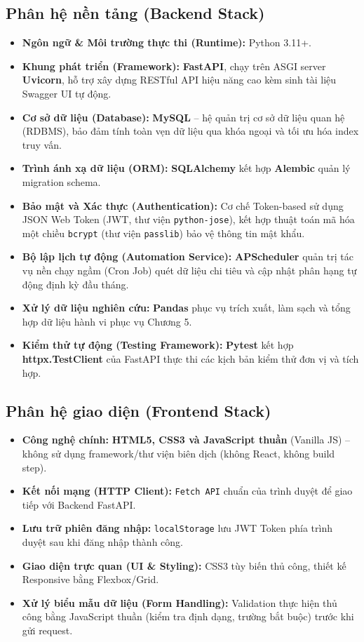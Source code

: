 \subsection{Phân hệ nền tảng (Backend Stack)}
\begin{itemize}
    \item \textbf{Ngôn ngữ \& Môi trường thực thi (Runtime):} Python 3.11+.
    \item \textbf{Khung phát triển (Framework):} \textbf{FastAPI}, chạy trên ASGI server \textbf{Uvicorn}, hỗ trợ xây dựng RESTful API hiệu năng cao kèm sinh tài liệu Swagger UI tự động.
    \item \textbf{Cơ sở dữ liệu (Database):} \textbf{MySQL} -- hệ quản trị cơ sở dữ liệu quan hệ (RDBMS), bảo đảm tính toàn vẹn dữ liệu qua khóa ngoại và tối ưu hóa index truy vấn.
    \item \textbf{Trình ánh xạ dữ liệu (ORM):} \textbf{SQLAlchemy} kết hợp \textbf{Alembic} quản lý migration schema.
    \item \textbf{Bảo mật và Xác thực (Authentication):} Cơ chế Token-based sử dụng JSON Web Token (JWT, thư viện \texttt{python-jose}), kết hợp thuật toán mã hóa một chiều \texttt{bcrypt} (thư viện \texttt{passlib}) bảo vệ thông tin mật khẩu.
    \item \textbf{Bộ lập lịch tự động (Automation Service):} \textbf{APScheduler} quản trị tác vụ nền chạy ngầm (Cron Job) quét dữ liệu chi tiêu và cập nhật phân hạng tự động định kỳ đầu tháng.
    \item \textbf{Xử lý dữ liệu nghiên cứu:} \textbf{Pandas} phục vụ trích xuất, làm sạch và tổng hợp dữ liệu hành vi phục vụ Chương 5.
    \item \textbf{Kiểm thử tự động (Testing Framework):} \textbf{Pytest} kết hợp \textbf{httpx.TestClient} của FastAPI thực thi các kịch bản kiểm thử đơn vị và tích hợp.
\end{itemize}

\subsection{Phân hệ giao diện (Frontend Stack)}
\begin{itemize}
    \item \textbf{Công nghệ chính:} \textbf{HTML5, CSS3 và JavaScript thuần} (Vanilla JS) -- không sử dụng framework/thư viện biên dịch (không React, không build step).
    \item \textbf{Kết nối mạng (HTTP Client):} \texttt{Fetch API} chuẩn của trình duyệt để giao tiếp với Backend FastAPI.
    \item \textbf{Lưu trữ phiên đăng nhập:} \texttt{localStorage} lưu JWT Token phía trình duyệt sau khi đăng nhập thành công.
    \item \textbf{Giao diện trực quan (UI \& Styling):} CSS3 tùy biến thủ công, thiết kế Responsive bằng Flexbox/Grid.
    \item \textbf{Xử lý biểu mẫu dữ liệu (Form Handling):} Validation thực hiện thủ công bằng JavaScript thuần (kiểm tra định dạng, trường bắt buộc) trước khi gửi request.
\end{itemize}

